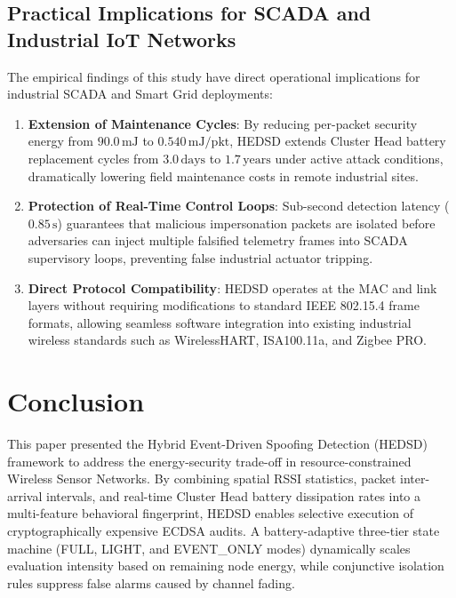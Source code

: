 \documentclass[conference]{IEEEtran}
\begin{document}
\subsection{Practical Implications for SCADA and Industrial IoT Networks}
The empirical findings of this study have direct operational implications for industrial SCADA and Smart Grid deployments:
\begin{enumerate}
    \item \textbf{Extension of Maintenance Cycles}: By reducing per-packet security energy from $90.0\,\text{mJ}$ to $0.540\,\text{mJ/pkt}$, HEDSD extends Cluster Head battery replacement cycles from $3.0\,\text{days}$ to $1.7\,\text{years}$ under active attack conditions, dramatically lowering field maintenance costs in remote industrial sites.
    \item \textbf{Protection of Real-Time Control Loops}: Sub-second detection latency ($0.85\,\text{s}$) guarantees that malicious impersonation packets are isolated before adversaries can inject multiple falsified telemetry frames into SCADA supervisory loops, preventing false industrial actuator tripping.
    \item \textbf{Direct Protocol Compatibility}: HEDSD operates at the MAC and link layers without requiring modifications to standard IEEE 802.15.4 frame formats, allowing seamless software integration into existing industrial wireless standards such as WirelessHART, ISA100.11a, and Zigbee PRO.
\end{enumerate}

\section{Conclusion}
\label{sec_conclusion}
This paper presented the Hybrid Event-Driven Spoofing Detection (HEDSD) framework to address the energy-security trade-off in resource-constrained Wireless Sensor Networks. By combining spatial RSSI statistics, packet inter-arrival intervals, and real-time Cluster Head battery dissipation rates into a multi-feature behavioral fingerprint, HEDSD enables selective execution of cryptographically expensive ECDSA audits. A battery-adaptive three-tier state machine (FULL, LIGHT, and EVENT\_ONLY modes) dynamically scales evaluation intensity based on remaining node energy, while conjunctive isolation rules suppress false alarms caused by channel fading.
\end{document}
